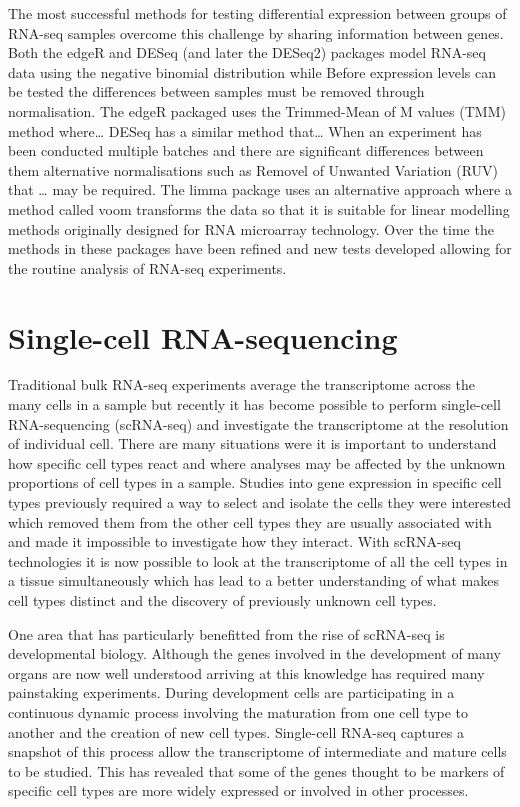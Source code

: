 \documentclass[11pt,a4paper,titlepage,twoside,openright]{style/unimelbthesis}
\theoremstyle{definition}
\theoremstyle{definition}
\theoremstyle{definition}
\theoremstyle{remark}
\begin{document}
\begin{mainmatter}
The most successful methods for testing differential expression between groups of RNA-seq samples overcome this challenge by sharing information between genes. Both the edgeR and DESeq (and later the DESeq2) packages model RNA-seq data using the negative binomial distribution while Before expression levels can be tested the differences between samples must be removed through normalisation. The edgeR packaged uses the Trimmed-Mean of M values (TMM) method where\ldots{} DESeq has a similar method that\ldots{} When an experiment has been conducted multiple batches and there are significant differences between them alternative normalisations such as Removel of Unwanted Variation (RUV) that \ldots{} may be required. The limma package uses an alternative approach where a method called voom transforms the data so that it is suitable for linear modelling methods originally designed for RNA microarray technology. Over the time the methods in these packages have been refined and new tests developed allowing for the routine analysis of RNA-seq experiments.

\hypertarget{single-cell-rna-sequencing}{%
\section{Single-cell RNA-sequencing}\label{single-cell-rna-sequencing}}

Traditional bulk RNA-seq experiments average the transcriptome across the many cells in a sample but recently it has become possible to perform single-cell RNA-sequencing (scRNA-seq) and investigate the transcriptome at the resolution of individual cell. There are many situations were it is important to understand how specific cell types react and where analyses may be affected by the unknown proportions of cell types in a sample. Studies into gene expression in specific cell types previously required a way to select and isolate the cells they were interested which removed them from the other cell types they are usually associated with and made it impossible to investigate how they interact. With scRNA-seq technologies it is now possible to look at the transcriptome of all the cell types in a tissue simultaneously which has lead to a better understanding of what makes cell types distinct and the discovery of previously unknown cell types.

One area that has particularly benefitted from the rise of scRNA-seq is developmental biology. Although the genes involved in the development of many organs are now well understood arriving at this knowledge has required many painstaking experiments. During development cells are participating in a continuous dynamic process involving the maturation from one cell type to another and the creation of new cell types. Single-cell RNA-seq captures a snapshot of this process allow the transcriptome of intermediate and mature cells to be studied. This has revealed that some of the genes thought to be markers of specific cell types are more widely expressed or involved in other processes.


\end{mainmatter}
\end{document}
